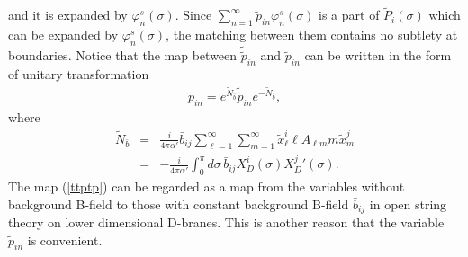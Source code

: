 \documentclass[a4paper,12pt]{article}
\newcommand{\nn}{\nonumber\\}
\newcommand{\si}{\varphi^s}
\newcommand{\XD}{X_D}
\begin{document}
and it is expanded by $\si_n(\sigma)$.
Since $\sum_{n=1}^\infty \tilde{p}_{in} \si_n(\sigma)$
is a part of $\tilde{P}_{i}(\sigma)$ which can be
expanded by $\si_n(\sigma)$,
the matching between them contains no subtlety at boundaries.
Notice that
the map between  $\tilde{\tilde{p}}_{in}$ and $\tilde{p}_{in}$
can be written in the form of unitary
transformation
\begin{eqnarray}
 \label{ttptp}
\tilde{p}_{in} =
e^{\tilde{N}_{\bar{b}}}
\tilde{\tilde{p}}_{in} 
e^{-\tilde{N}_{\bar{b}}},
\end{eqnarray}
where
\begin{eqnarray}
 \label{Nb}
\tilde{N}_{\bar{b}} &=& 
\frac{i}{4\pi\alpha'} \bar{b}_{ij}
\sum_{\ell= 1}^\infty \sum_{m=1}^\infty
\tilde{x}_\ell^i \ell A_{\ell m} m  \tilde{x}_m^j 
\nn
&=&
-\frac{i}{4\pi\alpha'}
\int_0^\pi
d\sigma\,
\bar{b}_{ij}
\XD^i(\sigma){\XD^j}'(\sigma).
\end{eqnarray}
The map (\ref{ttptp}) can be regarded as
a map from the variables without background B-field
to those with constant 
background B-field $\bar{b}_{ij}$
in open string theory
on lower dimensional
D-branes.
This is another reason 
that the variable $\tilde{p}_{in}$ is convenient.
\end{document}
